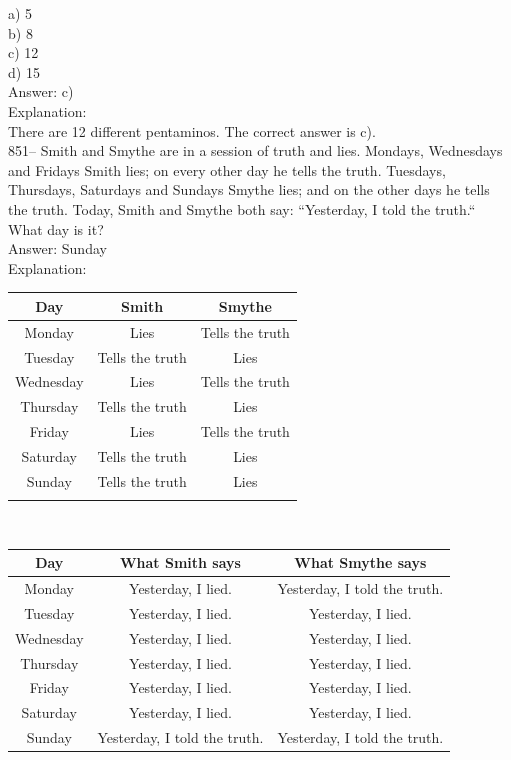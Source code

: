 \documentclass[letterpaper, 12pt]{article}
\begin{document}
a) 5\\
b) 8\\
c) 12\\
d) 15\\

Answer: c)\\

Explanation: \\
There are 12 different pentaminos.  The correct answer is c).\\

851-- Smith and Smythe are in a session of truth and lies. Mondays, Wednesdays and Fridays Smith lies; on every other day he tells the truth. Tuesdays, Thursdays, Saturdays and Sundays Smythe lies; and on the other days he tells the truth. Today, Smith and Smythe both say: ``Yesterday, I told the truth.``  What day is it?\\


Answer: Sunday\\

Explanation: \\

\begin{tabular}{|c|c|c|} \hline
{\bf Day} & {\bf Smith} & {\bf Smythe} \\ \hline \hline

Monday    & Lies  &  Tells the truth      \\ \hline
Tuesday   & Tells the truth      &  Lies  \\ \hline
Wednesday & Lies  &  Tells the truth      \\ \hline
Thursday  & Tells the truth      &  Lies  \\ \hline
Friday    & Lies  &  Tells the truth      \\ \hline
Saturday  & Tells the truth      &  Lies  \\ \hline
Sunday    & Tells the truth  &  Lies      \\ \hline
\multicolumn{3}{c}{}\\
\end{tabular}\\

\begin{tabular}{|c|c|c|} \hline
{\bf Day} & {\bf What Smith says } & {\bf What Smythe says } \\ \hline
\hline

Monday     & Yesterday, I lied.       &  Yesterday, I told the truth.   \\ \hline
Tuesday     & Yesterday, I lied.      &  Yesterday, I lied.       \\
\hline Wednesday  & Yesterday, I lied.      &  Yesterday, I lied.
\\ \hline Thursday     & Yesterday, I lied.      &  Yesterday, I lied.
\\ \hline Friday  & Yesterday, I lied.      &  Yesterday, I lied.
\\ \hline Saturday    & Yesterday, I lied.      &  Yesterday, I lied.
\\ \hline Sunday  & Yesterday, I told the truth.  &  Yesterday, I told the truth.       \\ \hline
\end{tabular}\\
\end{document}

